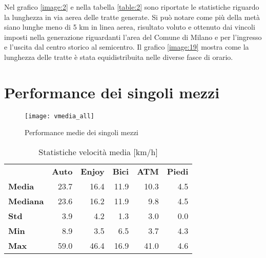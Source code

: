 Nel grafico \ref{image:2} e nella tabella \ref{table:2} sono riportate le statistiche riguardo la lunghezza in via aerea delle tratte generate. Si può notare come più della metà siano lunghe meno di 5 km in linea aerea, risultato voluto e ottenuto dai vincoli imposti nella generazione riguardanti l'area del Comune di Milano e per l'ingresso e l'uscita dal centro storico al semicentro. Il grafico \ref{image:19} mostra come la lunghezza delle tratte è stata equidistribuita nelle diverse fasce di orario.

\section{Performance dei singoli mezzi}


\begin{figure}[H]
	\texttt{[image: vmedia\_all]}
	\caption{Performance medie dei singoli mezzi}
	\label{image:26}
\end{figure}

\begin{table}[H]
\centering
\begin{tabular}{ | l r r r r r | }
\hline
& \textbf{Auto} & \textbf{Enjoy} & \textbf{Bici} & \textbf{ATM} & \textbf{Piedi} \\
\textbf{Media}      & 23.7 & 16.4 & 11.9 & 10.3 & 4.5 \\
\textbf{Mediana} & 23.6 & 16.2 & 11.9 &   9.8 & 4.5 \\
\textbf{Std}             &  3.9 &   4.2 &   1.3 &    3.0 & 0.0 \\
\textbf{Min}            &  8.9 &   3.5 &   6.5 &    3.7 & 4.3 \\
\textbf{Max}         & 59.0 & 46.4 & 16.9 &  41.0 & 4.6 \\
\hline
\end{tabular}
\caption{Statistiche velocità media [km/h]}
\label{table:3}
\end{table}

